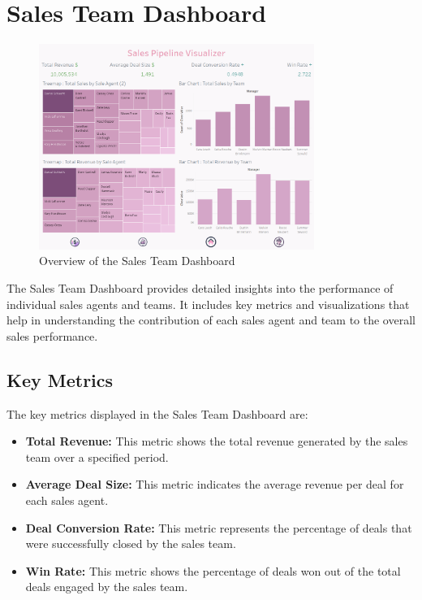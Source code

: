 \documentclass{article}
\begin{document}
\section{Sales Team Dashboard}
\begin{figure}[h!]
    \centering
    \includegraphics[width=0.8\textwidth]{resources/swappy-20240527_160845.png}
    \caption{Overview of the Sales Team Dashboard}
    \label{fig:sales_team_dashboard_overview}
\end{figure}

The Sales Team Dashboard provides detailed insights into the performance of individual sales agents and teams. It includes key metrics and visualizations that help in understanding the contribution of each sales agent and team to the overall sales performance.

\subsection{Key Metrics}
The key metrics displayed in the Sales Team Dashboard are:
\begin{itemize}
    \item \textbf{Total Revenue:} This metric shows the total revenue generated by the sales team over a specified period.
    \item \textbf{Average Deal Size:} This metric indicates the average revenue per deal for each sales agent.
    \item \textbf{Deal Conversion Rate:} This metric represents the percentage of deals that were successfully closed by the sales team.
    \item \textbf{Win Rate:} This metric shows the percentage of deals won out of the total deals engaged by the sales team.
\end{itemize}
\end{document}
